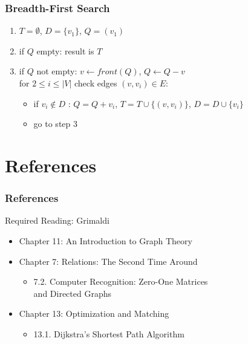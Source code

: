 \documentclass[dvipsnames]{beamer}
\begin{document}

\begin{frame}
  \frametitle{Breadth-First Search}

  \begin{enumerate}
    \item $T=\emptyset$, $D=\{v_1\}$, $Q=(v_1)$

    \pause
    \smallskip
    \item if $Q$ empty: result is $T$

    \smallskip
    \item if $Q$ not empty: $v \leftarrow front(Q)$, $Q \leftarrow Q - v$\\
      for $2 \leq i \leq |V|$ check edges $(v,v_i) \in E$:
    \begin{itemize}
      \item if $v_i \notin D$ : $Q = Q + v_i$, $T = T \cup \{(v,v_i)\}$,
        $D=D \cup \{v_i\}$
       \item go to step 3
    \end{itemize}
  \end{enumerate}
\end{frame}


\section*{References}

\begin{frame}
  \frametitle{References}

  \begin{block}{Required Reading: Grimaldi}
    \begin{itemize}
      \item Chapter 11: \alert{An Introduction to Graph Theory}

      \item Chapter 7: Relations: The Second Time Around
      \begin{itemize}
        \item 7.2. \alert{Computer Recognition: Zero-One Matrices\\
                          and Directed Graphs}
      \end{itemize}

      \item Chapter 13: Optimization and Matching
      \begin{itemize}
        \item 13.1. \alert{Dijkstra's Shortest Path Algorithm}
      \end{itemize}
    \end{itemize}
  \end{block}
\end{frame}
\end{document}
